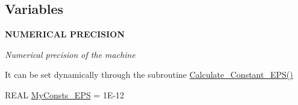 \subsection*{Variables}
\begin{Indent}{\bf NUMERICAL PRECISION}\par
{\em \label{_amgrp06d6057c95b18103ce7db924b914f0ce}
Numerical precision of the machine \par
 It can be set dynamically through the subroutine \hyperlink{namespace_my_consts_a30010b124d6326386412e65f9673b934}{Calculate\_\-Constant\_\-EPS()} }\begin{DoxyCompactItemize}
\item 
REAL \hyperlink{namespace_my_consts_a16f360c5da46572d6fb585806a1df519}{MyConsts\_\-EPS} = 1E-\/12
\end{DoxyCompactItemize}
\end{Indent}
